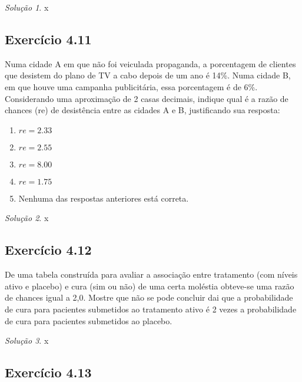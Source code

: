 \documentclass[
]{latex/krantz}
\providecommand{\tightlist}{%
  \setlength{\itemsep}{0pt}\setlength{\parskip}{0pt}}
\theoremstyle{definition}
\theoremstyle{definition}
\theoremstyle{definition}
\theoremstyle{definition}
\theoremstyle{remark}
\newtheorem*{solution}{Solução}
\begin{document}
\begin{solution}
x
\end{solution}

\hypertarget{exr4-11}{%
\subsection*{Exercício 4.11}\label{exr4-11}}

Numa cidade A em que não foi veiculada propaganda, a porcentagem de clientes que desistem do plano de TV a cabo depois de um ano é 14\%. Numa cidade B, em que houve uma campanha publicitária, essa porcentagem é de 6\%. Considerando uma aproximação de 2 casas decimais, indique qual é a razão de chances (re) de desistência entre as cidades A e B, justificando sua resposta:

\begin{enumerate}
\def\labelenumi{\alph{enumi})}
\tightlist
\item
  \(re = 2.33\)
\item
  \(re = 2.55\)
\item
  \(re = 8.00\)
\item
  \(re = 1.75\)
\item
  Nenhuma das respostas anteriores está correta.
\end{enumerate}

\begin{solution}
x
\end{solution}

\hypertarget{exr4-12}{%
\subsection*{Exercício 4.12}\label{exr4-12}}

De uma tabela construída para avaliar a associação entre tratamento (com níveis ativo e placebo) e cura (sim ou não) de uma certa moléstia obteve-se uma razão de chances igual a 2,0. Mostre que não se pode concluir dai que a probabilidade de cura para pacientes submetidos ao tratamento ativo é 2 vezes a probabilidade de cura para pacientes submetidos ao placebo.

\begin{solution}
x
\end{solution}

\hypertarget{exr4-13}{%
\subsection*{Exercício 4.13}\label{exr4-13}}
\end{document}
